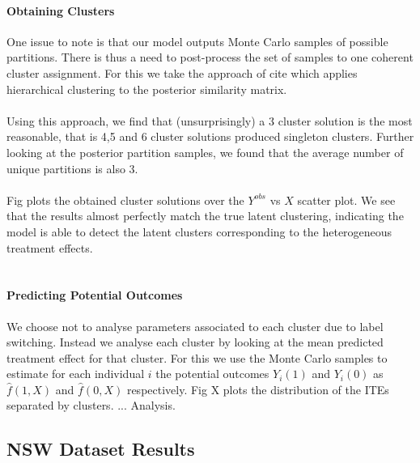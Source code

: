 \documentclass{article}
\begin{document}
\paragraph{Obtaining Clusters} One issue to note is that our model outputs Monte Carlo samples of possible partitions. There is thus a need to post-process the set of samples to one coherent cluster assignment. For this we take the approach of cite which applies hierarchical clustering to the posterior similarity matrix. 
\\ \\
Using this approach, we find that (unsurprisingly) a 3 cluster solution is the most reasonable, that is 4,5 and 6 cluster solutions produced singleton clusters. Further looking at the posterior partition samples, we found that the average number of unique partitions is also 3. 
\\ \\
Fig  plots the obtained cluster solutions over the $Y^{obs}$ vs $X$ scatter plot. We see that the results almost perfectly match the true latent clustering, indicating the model is able to detect the latent clusters corresponding to the heterogeneous treatment effects. 
\\ \\
\paragraph{Predicting Potential Outcomes} We choose not to analyse parameters associated to each cluster due to label switching. Instead we analyse each cluster by looking at the mean predicted treatment effect for that cluster. For this we use the Monte Carlo samples to estimate for each individual $i$ the potential outcomes $Y_i(1)$ and $Y_i(0)$ as $\hat{f}(1,X)$ and $\hat{f}(0,X)$ respectively. Fig X plots the distribution of the ITEs separated by clusters. ... Analysis.

\subsection{NSW Dataset Results} 
\end{document}
